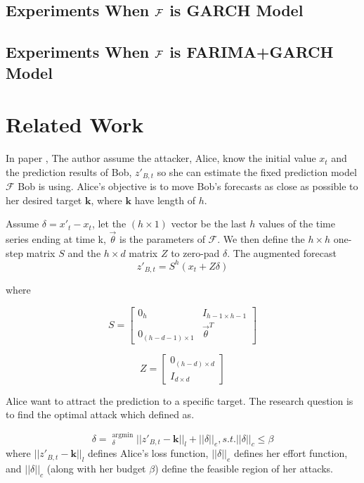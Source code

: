 \documentclass[journal]{IEEEtran}
\begin{document}
{\subsection{Experiments When ${\cal F}$ is GARCH Model}
\subsection{Experiments When ${\cal F}$ is FARIMA+GARCH Model}

}

\section{Related Work}
In paper \cite{alfeld2016data}, The author assume the attacker, Alice, know the initial value $x_t$ and the prediction results of Bob, $z'_{B,t}$ so she can estimate the fixed prediction model $\mathcal{F}$ Bob is using. Alice’s objective is to move Bob’s forecasts as close as possible to her desired target $\textbf{k}$, where $\textbf{k}$ have length of $h$.

Assume $\delta=x'_t - x_t$, let the $(h \times 1)$ vector be the last $h$ values of the time series ending at time k, $\vec \theta$ is the parameters of $\mathcal{F}$. We then define the $h \times h$ one-step matrix $S$ and the $h \times d$ matrix $Z$ to zero-pad $\delta$. The augmented forecast
\begin{equation}
    z'_{B,t}=S^{h}(x_t+Z\delta)
\end{equation} 

where

$$
	S=
	\left[
	\begin{array}{cc}
	0_h& I_{h-1\times h-1} \\ 
	0_{(h-d-1)\times 1}& \vec \theta^{T}
	\end{array}
	\right]
	$$
	
$$
	Z=
	\left[
	\begin{array}{c}
	0_{(h-d)\times d} \\ 
	I_{d\times d}
	\end{array}
	\right]
	$$

Alice want to attract the prediction to a specific target. The research question is to find the optimal attack which defined as.

\begin{equation}
   \delta=\mathop{}_{\delta}^{\text{argmin}}||z'_{B,t}-\textbf{k}||_{l}+||\delta||_{e}, s.t. ||\delta||_{c}\leq\beta
\end{equation}
where $||z'_{B,t}-\textbf{k}||_{l}$ defines Alice’s loss function, $||\delta||_{e}$ defines her effort function, and $||\delta||_{c}$ (along with her budget $\beta$) define the feasible region of her attacks.
\end{document}
